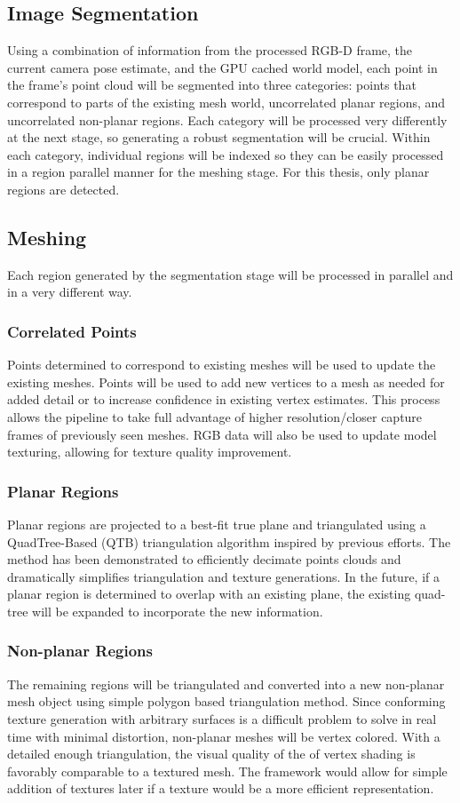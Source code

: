 \subsection{Image Segmentation}
Using a combination of information from the processed RGB-D frame, the current camera pose estimate, and the GPU cached world model, each point in the frame's point cloud will be segmented into three categories: points that correspond to parts of the existing mesh world, uncorrelated planar regions, and uncorrelated non-planar regions. Each category will be processed very differently at the next stage, so generating a robust segmentation will be crucial. Within each category, individual regions will be indexed so they can be easily processed in a region parallel manner for the meshing stage. For this thesis, only planar regions are detected.

\subsection{Meshing}
Each region generated by the segmentation stage will be processed in parallel and in a very different way.
\subsubsection{Correlated Points}
Points determined to correspond to existing meshes will be used to update the existing meshes. Points will be used to add new vertices to a mesh as needed for added detail or to increase confidence in existing vertex estimates. This process allows the pipeline to take full advantage of higher resolution/closer capture frames of previously seen meshes. RGB data will also be used to update model texturing, allowing for texture quality improvement.

\subsubsection{Planar Regions}
Planar regions are projected to a best-fit true plane and triangulated using a QuadTree-Based (QTB) triangulation algorithm inspired by previous efforts\cite{planesegmentationQTB,ma2013planar}. The method has been demonstrated to efficiently decimate points clouds and dramatically simplifies triangulation and texture generations. In the future, if a planar region is determined to overlap with an existing plane, the existing quad-tree will be expanded to incorporate the new information.

\subsubsection{Non-planar Regions}
The remaining regions will be triangulated and converted into a new non-planar mesh object using simple polygon based triangulation method. Since conforming texture generation with arbitrary surfaces is a difficult problem to solve in real time with minimal distortion, non-planar meshes will be vertex colored. With a detailed enough triangulation, the visual quality of the of vertex shading is favorably comparable to a textured mesh. The framework would allow for simple addition of textures later if a texture would be a more efficient representation.

